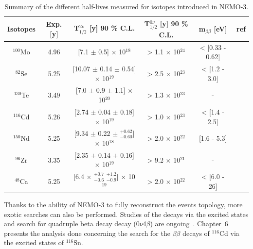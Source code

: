 \documentclass[main.tex]{subfiles}
\begin{document}
\begin{table}[h!]
\centering
\begin{tabular}{c|c|c|c|c|c}

Isotopes & Exp. [y] & T$_{\text{1/2}}^{\text{2}\nu}$ [y] 90 \% C.L. & T$_{\text{1/2}}^{\text{0}\nu}$ [y] 90 \% C.L. & m$_{\beta\beta}$ [eV] & ref\\

\toprule

$^{\text{100}}$Mo  & 4.96 & [7.1 $\pm$ 0.5] $\times$ 10$^{\text{18}}$ & > 1.1 $\times$ 10$^{\text{24}}$ & < [0.33 - 0.62] & \cite{NEMO3:Mo100} \\[0.1cm]

$^{\text{82}}$Se  & 5.25 & [10.07 $\pm$ 0.14 $\pm$ 0.54] $\times$ 10$^{\text{19}}$ & > 2.5 $\times$ 10$^{\text{23}}$  & < [1.2 - 3.0] &\cite{NEMO3:Se82}  \\[0.1cm]

$^{\text{130}}$Te & 3.49 &[7.0 $\pm$ 0.9 $\pm$ 1.1] $\times$ 10$^{\text{20}}$ & > 1.3 $\times$ 10$^{\text{23}}$  & - & \cite{NEMO3:Te130}\\[0.1cm]

$^{\text{116}}$Cd & 5.26 &[2.74 $\pm$ 0.04 $\pm$ 0.18] $\times$ 10$^{\text{19}}$ & > 1.0 $\times$ 10$^{\text{23}}$  & < [1.4 - 2.5] &\cite{Arnold2016bed} \\[0.1cm]

$^{\text{150}}$Nd & 5.25 &[9.34 $\pm$ 0.22 $\pm$ $^{+\text{0.62}}_{-\text{0.60}}$] $\times$ 10$^{\text{18}}$ & > 2.0 $\times$ 10$^{\text{22}}$  & [1.6 - 5.3] & \cite{NEMO3:Nd150}\\[0.1cm]

$^{\text{96}}$Zr  & 3.35 & [2.35 $\pm$ 0.14 $\pm$ 0.16] $\times$ 10$^{\text{19}}$ & > 9.2 $\times$ 10$^{\text{21}}$  & - & \cite{NEMO3:Zr96}\\[0.1cm]

$^{\text{48}}$Ca  & 5.25 &[6.4 $\times$ $^{+\text{0.7}}_{-\text{0.6}}$ $^{+\text{1.2}}_{-\text{0.9}}$] $\times$ 10$^{\text{19}}$ & > 2.0 $\times$ 10$^{\text{22}}$  & < [6.0 - 26] & \cite{NEMO3:Ca48}\\[0.1cm]

\bottomrule
\end{tabular}
\caption{Summary of the different half-lives measured for isotopes introduced in NEMO-3.}
\label{tab:SummaryDecayRateNEMO3}
\end{table}


\NI Thanks to the ability of NEMO-3 to fully reconstruct the events topology, more exotic searches can also be performed. Studies of the decays via the excited states and search for quadruple beta decay decay (0$\nu$4$\beta$) are ongoing~\cite{QuadrupleBetaDecayNEMO}. Chapter~6 presents the analysis done concerning the search for the $\beta\beta$ decays of $^{\text{116}}$Cd via the excited states of $^{\text{116}}$Sn.
\end{document}
